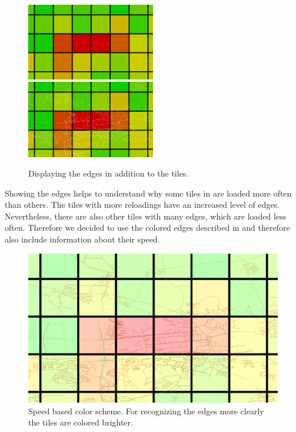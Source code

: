 \documentclass
[
    paper = a4,
    pagesize,
    12 pt,
    twoside,                       %
    open = right,
    DIV = calc,
    BCOR = 0 mm,                   %
    bibtotoc
]
{scrbook}
\begin{document}
\begin{figure}
    \includegraphics[width=0.5\textwidth]{Images/vis-edges-no.png}
    \includegraphics[width=0.5\textwidth]{Images/vis-edges-white.png}
\caption[]{Displaying the edges in addition to the tiles.}
\label{fig:white edges}
\end{figure}

Showing the edges helps to understand why some tiles in  are loaded more often than others.
The tiles with more reloadings have an increased level of edges.
Nevertheless, there are also other tiles with many edges, which are loaded less often.
Therefore we decided to use the colored edges described in  and therefore also include information about their speed.

\begin{figure}
    \includegraphics[width=\textwidth]{Images/vis-edges-hsv.png}
\caption[]{Speed based color scheme. For recognizing the edges more clearly the tiles are colored brighter.}
\label{fig:colored edges}
\end{figure}
\end{document}
